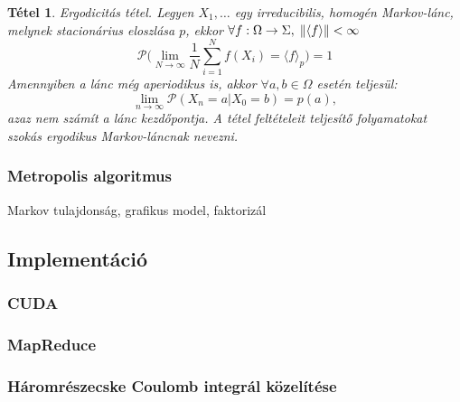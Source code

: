 \documentclass[10pt,a4paper]{article}
\numberwithin{equation}{subsection}
\numberwithin{figure}{section}
\newtheorem{theorem}{Tétel}[section]
\begin{document}
\begin{theorem}{Ergodicitás tétel.}
Legyen $X_1,\dots$ egy irreducibilis, homogén Markov-lánc, melynek stacionárius eloszlása  $p$, ekkor  
$\forall f:\Omega\rightarrow\Sigma ,\;\norm{\langle f\rangle}<\infty$
\begin{equation}
\mathcal{P}\Bigg(\lim_{N\rightarrow\infty}\frac{1}{N}\sum_{i=1}^Nf(X_i)=\langle f \rangle_p\Bigg)=1
\end{equation}
Amennyiben a lánc még aperiodikus is, akkor $\forall a,b\in\Omega$ esetén teljesül: 
\begin{equation}
\lim_{n\rightarrow\infty}\mathcal{P}(X_n=a|X_0=b) = p(a),
\end{equation}
azaz nem számít a lánc kezdőpontja. A tétel feltételeit teljesítő folyamatokat szokás ergodikus Markov-láncnak nevezni.
\end{theorem}


\subsubsection{Metropolis algoritmus}
Markov tulajdonság, grafikus model, faktorizál

\subsection{Implementáció}
\subsubsection{CUDA}\label{sec:CUDA}
\subsubsection{MapReduce}\label{sec:MapReduce}
\subsubsection{Háromrészecske Coulomb integrál közelítése}
\end{document}

